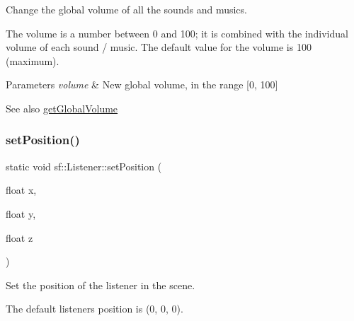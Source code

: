 Change the global volume of all the sounds and musics. 

The volume is a number between 0 and 100; it is combined with the individual volume of each sound / music. The default value for the volume is 100 (maximum).


\begin{DoxyParams}{Parameters}
{\em volume} & New global volume, in the range \mbox{[}0, 100\mbox{]}\\
\hline
\end{DoxyParams}
\begin{DoxySeeAlso}{See also}
\mbox{\hyperlink{classsf_1_1_listener_a137ea535799bdf70be6ec969673d4d33}{get\+Global\+Volume}} \begin{DoxyVerb}\end{DoxyVerb}
 
\end{DoxySeeAlso}
\mbox{\label{classsf_1_1_listener_a5bc2d8d18ea2d8f339d23cbf17678564}} 
\subsubsection{\texorpdfstring{setPosition()}{setPosition()}\hspace{0.1cm}{\footnotesize\ttfamily [1/2]}}
{\footnotesize\ttfamily static void sf\+::\+Listener\+::set\+Position (\begin{DoxyParamCaption}\item[{float}]{x,  }\item[{float}]{y,  }\item[{float}]{z }\end{DoxyParamCaption})\hspace{0.3cm}{\ttfamily [static]}}



Set the position of the listener in the scene. 

The default listener\textquotesingle{}s position is (0, 0, 0).


